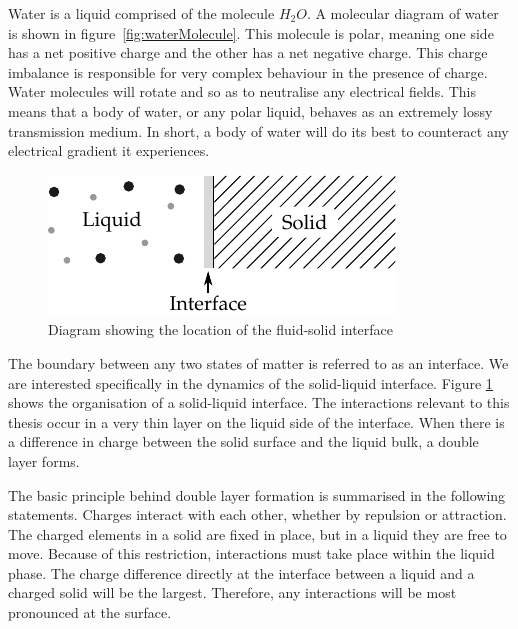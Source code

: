     Water is a liquid comprised of the molecule $H_{2}O$.
    A molecular diagram of water is shown in figure~\ref{fig:waterMolecule}.
    This molecule is polar, meaning one side has a net positive charge and the other has a net negative charge.
    This charge imbalance is responsible for very complex behaviour in the presence of charge.
    Water molecules will rotate and so as to neutralise any electrical fields.
    This means that a body of water, or any polar liquid, behaves as an extremely lossy transmission medium.
    In short, a body of water will do its best to counteract any electrical gradient it experiences.

    \begin{figure}[h]
        \begin{center}
            \includegraphics{content/introduction/graphics/simpleLayerDiagram}
        \end{center}
        \caption{Diagram showing the location of the fluid-solid interface}
        \label{fig:interfaceDiagram}
    \end{figure}

    The boundary between any two states of matter is referred to as an interface.
    We are interested specifically in the dynamics of the solid-liquid interface.
    Figure \ref{fig:interfaceDiagram} shows the organisation of a solid-liquid interface.
    The interactions relevant to this thesis occur in a very thin layer on the liquid side of the interface.
    When there is a difference in charge between the solid surface and the liquid bulk, a double layer forms.

    The basic principle behind double layer formation is summarised in the following statements.
    Charges interact with each other, whether by repulsion or attraction.
    The charged elements in a solid are fixed in place, but in a liquid they are free to move.
    Because of this restriction, interactions must take place within the liquid phase.
    The charge difference directly at the interface between a liquid and a charged solid will be the largest.
    Therefore, any interactions will be most pronounced at the surface.

